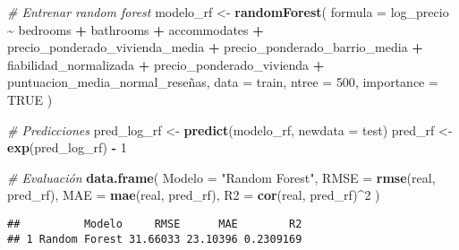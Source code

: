 \documentclass[
]{article}
\newenvironment{Shaded}{\begin{snugshade}}{\end{snugshade}}
\newcommand{\AttributeTok}[1]{\textcolor[rgb]{0.13,0.29,0.53}{#1}}
\newcommand{\CommentTok}[1]{\textcolor[rgb]{0.56,0.35,0.01}{\textit{#1}}}
\newcommand{\ConstantTok}[1]{\textcolor[rgb]{0.56,0.35,0.01}{#1}}
\newcommand{\DecValTok}[1]{\textcolor[rgb]{0.00,0.00,0.81}{#1}}
\newcommand{\FunctionTok}[1]{\textcolor[rgb]{0.13,0.29,0.53}{\textbf{#1}}}
\newcommand{\NormalTok}[1]{#1}
\newcommand{\OtherTok}[1]{\textcolor[rgb]{0.56,0.35,0.01}{#1}}
\newcommand{\SpecialCharTok}[1]{\textcolor[rgb]{0.81,0.36,0.00}{\textbf{#1}}}
\newcommand{\StringTok}[1]{\textcolor[rgb]{0.31,0.60,0.02}{#1}}
\begin{document}
\begin{Shaded}
\begin{Highlighting}[]
\CommentTok{\# Entrenar random forest}
\NormalTok{modelo\_rf }\OtherTok{\textless{}{-}} \FunctionTok{randomForest}\NormalTok{(}
  \AttributeTok{formula =}\NormalTok{ log\_precio }\SpecialCharTok{\textasciitilde{}}\NormalTok{ bedrooms }\SpecialCharTok{+}\NormalTok{ bathrooms }\SpecialCharTok{+}\NormalTok{ accommodates }\SpecialCharTok{+}
\NormalTok{    precio\_ponderado\_vivienda\_media }\SpecialCharTok{+}\NormalTok{ precio\_ponderado\_barrio\_media }\SpecialCharTok{+}
\NormalTok{    fiabilidad\_normalizada }\SpecialCharTok{+}\NormalTok{ precio\_ponderado\_vivienda }\SpecialCharTok{+}
\NormalTok{    puntuacion\_media\_normal\_reseñas,}
  \AttributeTok{data =}\NormalTok{ train,}
  \AttributeTok{ntree =} \DecValTok{500}\NormalTok{,}
  \AttributeTok{importance =} \ConstantTok{TRUE}
\NormalTok{)}

\CommentTok{\# Predicciones}
\NormalTok{pred\_log\_rf }\OtherTok{\textless{}{-}} \FunctionTok{predict}\NormalTok{(modelo\_rf, }\AttributeTok{newdata =}\NormalTok{ test)}
\NormalTok{pred\_rf }\OtherTok{\textless{}{-}} \FunctionTok{exp}\NormalTok{(pred\_log\_rf) }\SpecialCharTok{{-}} \DecValTok{1}

\CommentTok{\# Evaluación}
\FunctionTok{data.frame}\NormalTok{(}
  \AttributeTok{Modelo =} \StringTok{"Random Forest"}\NormalTok{,}
  \AttributeTok{RMSE =} \FunctionTok{rmse}\NormalTok{(real, pred\_rf),}
  \AttributeTok{MAE =} \FunctionTok{mae}\NormalTok{(real, pred\_rf),}
  \AttributeTok{R2 =} \FunctionTok{cor}\NormalTok{(real, pred\_rf)}\SpecialCharTok{\^{}}\DecValTok{2}
\NormalTok{)}
\end{Highlighting}
\end{Shaded}

\begin{verbatim}
##          Modelo     RMSE      MAE        R2
## 1 Random Forest 31.66033 23.10396 0.2309169
\end{verbatim}
\end{document}
